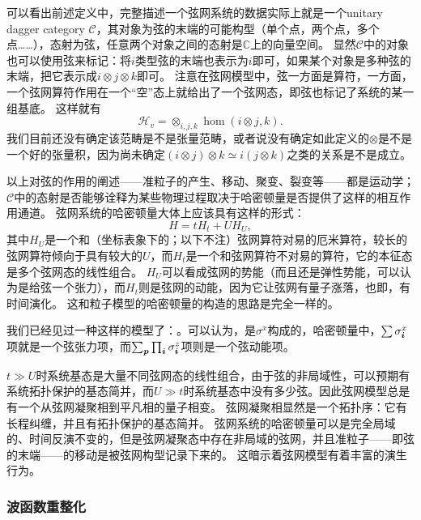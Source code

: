 可以看出前述定义中，完整描述一个弦网系统的数据实际上就是一个unitary dagger category $\mathcal{C}$，其对象为弦的末端的可能构型（单个点，两个点，多个点……），态射为弦，任意两个对象之间的态射是$\mathbb{C}$上的向量空间。
显然$\mathcal{C}$中的对象也可以使用弦来标记：将$i$类型弦的末端也表示为$i$即可，如果某个对象是多种弦的末端，把它表示成$i \otimes j \otimes k$即可。
注意在弦网模型中，弦一方面是算符，一方面，一个弦网算符作用在一个“空”态上就给出了一个弦网态，即弦也标记了系统的某一组基底。
这样就有
\begin{equation}
    \mathcal{H}_v = \otimes_{i, j, k} \hom(i \otimes j, k).
\end{equation}
我们目前还没有确定该范畴是不是张量范畴，或者说没有确定如此定义的$\otimes$是不是一个好的张量积，因为尚未确定$(i \otimes j) \otimes k \simeq i (j \otimes k)$之类的关系是不是成立。

以上对弦的作用的阐述——准粒子的产生、移动、聚变、裂变等——都是运动学；$\mathcal{C}$中的态射是否能够诠释为某些物理过程取决于哈密顿量是否提供了这样的相互作用通道。
弦网系统的哈密顿量大体上应该具有这样的形式：
\begin{equation}
    H = t H_t + U H_U,
\end{equation}
其中$H_U$是一个和（坐标表象下的；以下不注）弦网算符对易的厄米算符，较长的弦网算符倾向于具有较大的$U$，而$H_t$是一个和弦网算符不对易的算符，它的本征态是多个弦网态的线性组合。
$H_U$可以看成弦网的势能（而且还是弹性势能，可以认为是给弦一个张力），而$H_t$则是弦网的动能，因为它让弦网有量子涨落，也即，有时间演化。
这和粒子模型的哈密顿量的构造的思路是完全一样的。

我们已经见过一种这样的模型了：。可以认为，是$\sigma^x$构成的，哈密顿量中，$\sum \sigma^x_{\vb*{i}}$项就是一个弦张力项，而$\sum_{\vb*{p}} \prod_{\vb*{i}} \sigma^z_{\vb*{i}}$项则是一个弦动能项。

$t \gg U$时系统基态是大量不同弦网态的线性组合，由于弦的非局域性，可以预期有系统拓扑保护的基态简并，而$U \gg t$时系统基态中没有多少弦。因此弦网模型总是有一个从弦网凝聚相到平凡相的量子相变。
弦网凝聚相显然是一个拓扑序：它有长程纠缠，并且有拓扑保护的基态简并。
弦网系统的哈密顿量可以是完全局域的、时间反演不变的，但是弦网凝聚态中存在非局域的弦网，并且准粒子——即弦的末端——的移动是被弦网构型记录下来的。
这暗示着弦网模型有着丰富的演生行为。

\subsubsection{波函数重整化}

